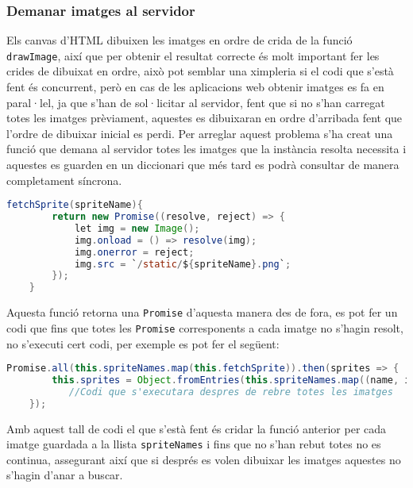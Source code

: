 \subsubsection{Demanar imatges al servidor}
Els canvas d'HTML dibuixen les imatges en ordre de crida de la funció \lstinline{drawImage}, així que per obtenir el resultat correcte és molt important fer les crides de dibuixat en ordre, això pot semblar una ximpleria si el codi que s'està fent és concurrent, però en cas de les aplicacions web obtenir imatges es fa en paral·lel, ja que s'han de sol·licitar al servidor, fent que si no s'han carregat totes les imatges prèviament, aquestes es dibuixaran en ordre d'arribada fent que l'ordre de dibuixar inicial es perdi. Per arreglar aquest problema s'ha creat una funció que demana al servidor totes les imatges que la instància resolta necessita i aquestes es guarden en un diccionari que més tard es podrà consultar de manera completament síncrona.\\

\begin{lstlisting}[language=Java, caption=Fetch sprite]
    fetchSprite(spriteName){
        return new Promise((resolve, reject) => {
            let img = new Image();
            img.onload = () => resolve(img);
            img.onerror = reject;
            img.src = `/static/${spriteName}.png`;
        });
    }
\end{lstlisting}

Aquesta funció retorna una \lstinline{Promise} d'aquesta manera des de fora, es pot fer un codi que fins que totes les \lstinline{Promise} corresponents a cada imatge no s'hagin resolt, no s'executi cert codi, per exemple es pot fer el següent:

\begin{lstlisting}[language=Java, caption=Fetch all sprites]
    Promise.all(this.spriteNames.map(this.fetchSprite)).then(sprites => {
        this.sprites = Object.fromEntries(this.spriteNames.map((name, i) => [name, sprites[i]]));
           //Codi que s'executara despres de rebre totes les imatges
    });
\end{lstlisting}

Amb aquest tall de codi el que s'està fent és cridar la funció anterior per cada imatge guardada a la llista \lstinline{spriteNames} i fins que no s'han rebut totes no es continua, assegurant així que si després es volen dibuixar les imatges aquestes no s'hagin d'anar a buscar.


